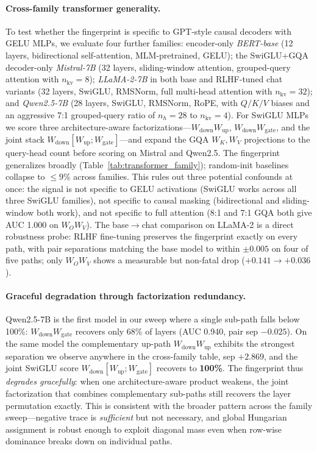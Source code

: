 \documentclass[wcp]{jmlr}
\begin{document}
\paragraph{Cross-family transformer generality.}
To test whether the fingerprint is specific to GPT-style causal decoders with GELU MLPs, we evaluate four further families: encoder-only \emph{BERT-base} \citep{devlin2019bert} (12 layers, bidirectional self-attention, MLM-pretrained, GELU); the SwiGLU+GQA decoder-only \emph{Mistral-7B} \citep{jiang2023mistral7b} (32 layers, sliding-window attention, grouped-query attention with $n_{\text{kv}}{=}8$); \emph{LLaMA-2-7B} \citep{touvron2023llama2} in both base and RLHF-tuned chat variants (32 layers, SwiGLU, RMSNorm, full multi-head attention with $n_{\text{kv}}{=}32$); and \emph{Qwen2.5-7B} \citep{qwen2.5} (28 layers, SwiGLU, RMSNorm, RoPE, with $Q/K/V$ biases and an aggressive 7{:}1 grouped-query ratio of $n_h{=}28$ to $n_{\text{kv}}{=}4$). For SwiGLU MLPs we score three architecture-aware factorizations---$W_{\text{down}}W_{\text{up}}$, $W_{\text{down}}W_{\text{gate}}$, and the joint stack $W_{\text{down}}[W_{\text{up}};W_{\text{gate}}]$---and expand the GQA $W_K,W_V$ projections to the query-head count before scoring on Mistral and Qwen2.5. The fingerprint generalizes broadly (Table~\ref{tab:transformer_family}); random-init baselines collapse to $\le\!9\%$ across families. This rules out three potential confounds at once: the signal is not specific to GELU activations (SwiGLU works across all three SwiGLU families), not specific to causal masking (bidirectional and sliding-window both work), and not specific to full attention (8{:}1 and 7{:}1 GQA both give AUC 1.000 on $W_OW_V$). The base$\to$chat comparison on LLaMA-2 is a direct robustness probe: RLHF fine-tuning preserves the fingerprint exactly on every path, with pair separations matching the base model to within $\pm 0.005$ on four of five paths; only $W_OW_V$ shows a measurable but non-fatal drop ($+0.141\to +0.036$).

\paragraph{Graceful degradation through factorization redundancy.}
Qwen2.5-7B is the first model in our sweep where a single sub-path falls below 100\%: $W_{\text{down}}W_{\text{gate}}$ recovers only 68\% of layers (AUC 0.940, pair sep $-0.025$). On the same model the complementary up-path $W_{\text{down}}W_{\text{up}}$ exhibits the strongest separation we observe anywhere in the cross-family table, sep $+2.869$, and the joint SwiGLU score $W_{\text{down}}[W_{\text{up}};W_{\text{gate}}]$ recovers to \textbf{100\%}. The fingerprint thus \emph{degrades gracefully}: when one architecture-aware product weakens, the joint factorization that combines complementary sub-paths still recovers the layer permutation exactly. This is consistent with the broader pattern across the family sweep---negative trace is \emph{sufficient} but not necessary, and global Hungarian assignment is robust enough to exploit diagonal mass even when row-wise dominance breaks down on individual paths.
\end{document}
